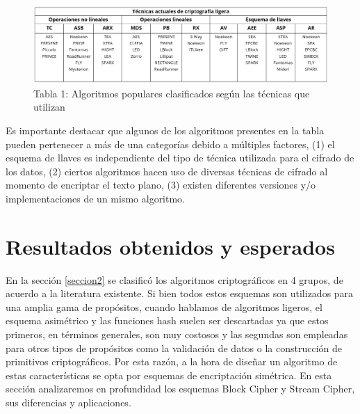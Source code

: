 \documentclass[a4paper,10pt]{article}
\begin{document}
	\begin{figure}[h]
		\centering
		\includegraphics[width=1.0\textwidth]{tablaAlgoritmosCriptografiaLigera.PNG}
		\caption{Tabla 1: Algoritmos populares clasificados según las técnicas que utilizan}
		\label{algoritmosCriptografiaLigera}
	\end{figure}
	
	
	Es importante destacar que algunos de los algoritmos presentes en la tabla pueden pertenecer a más de una categorías debido a múltiples factores, (1) el esquema de llaves es independiente del tipo de técnica utilizada para el cifrado de los datos, (2) ciertos algoritmos hacen uso de diversas técnicas de cifrado al momento de encriptar el texto plano, (3) existen diferentes versiones y/o implementaciones de un mismo algoritmo.
	\section{Resultados obtenidos y esperados}
	\label{seccion3}
	En la sección \ref{seccion2} se clasificó los algoritmos criptográficos en 4 grupos, de acuerdo a la literatura existente. Si bien todos estos esquemas son utilizados para una amplia gama de propósitos, cuando hablamos de algoritmos ligeros, el esquema asimétrico y las funciones hash suelen ser descartadas ya que estos primeros, en términos generales, son muy costosos y las segundas son empleadas para otros tipos de propósitos como la validación de datos o la construcción de primitivos criptográficos. Por esta razón, a la hora de diseñar un algoritmo de estas características se opta por esquemas de encriptación simétrica. En esta sección analizaremos en profundidad los esquemas Block Cipher y Stream Cipher, sus diferencias y aplicaciones.
\end{document}
